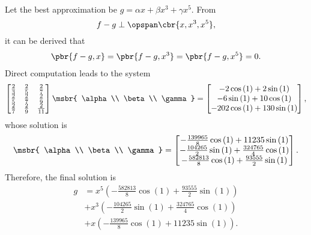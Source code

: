 \documentclass[english, nochinese]{../TeXTemplate/pkupaper}
\begin{document}
\begin{thmquestion}
\ 
\begin{thmanswer}
Let the best approximation be $ g = \alpha x + \beta x^3 + \gamma x^5 $. From
\begin{equation}
f - g \perp \opspan \cbr{ x, x^3, x^5 },
\end{equation}
it can be derived that
\begin{gather}
\pbr{ f - g, x } = \pbr{ f - g, x^3 } = \pbr{ f - g, x^5 } = 0.
\end{gather}
Direct computation leads to the system
\begin{equation}
\left[\begin{matrix}\frac{2}{3} & \frac{2}{5} & \frac{2}{7}\\\frac{2}{5} & \frac{2}{7} & \frac{2}{9}\\\frac{2}{7} & \frac{2}{9} & \frac{2}{11}\end{matrix}\right] \msbr{ \alpha \\ \beta \\ \gamma } = \left[\begin{matrix}- 2 \cos{\left (1 \right )} + 2 \sin{\left (1 \right )}\\- 6 \sin{\left (1 \right )} + 10 \cos{\left (1 \right )}\\- 202 \cos{\left (1 \right )} + 130 \sin{\left (1 \right )}\end{matrix}\right],
\end{equation}
whose solution is
\begin{equation}
\msbr{ \alpha \\ \beta \\ \gamma } = \left[\begin{matrix}- \frac{139965}{8} \cos{\left (1 \right )} + 11235 \sin{\left (1 \right )}\\- \frac{104265}{2} \sin{\left (1 \right )} + \frac{324765}{4} \cos{\left (1 \right )}\\- \frac{582813}{8} \cos{\left (1 \right )} + \frac{93555}{2} \sin{\left (1 \right )}\end{matrix}\right].
\end{equation}
Therefore, the final solution is
\begin{equation}
\begin{split}
g &= x^{5} \left(- \frac{582813}{8} \cos{\left (1 \right )} + \frac{93555}{2} \sin{\left (1 \right )}\right) \\
&+ x^{3} \left(- \frac{104265}{2} \sin{\left (1 \right )} + \frac{324765}{4} \cos{\left (1 \right )}\right) \\
&+ x \left(- \frac{139965}{8} \cos{\left (1 \right )} + 11235 \sin{\left (1 \right )}\right).
\end{split}
\end{equation}
\end{thmanswer}
\end{thmquestion}
\end{document}
